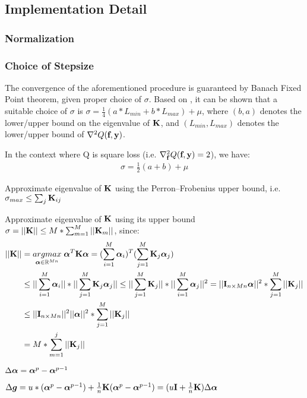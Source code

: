 \documentclass[tablecaption=bottom,wcp]{jmlr} %
\begin{document}
\subsection{Implementation Detail}
\subsubsection{Normalization}



\subsubsection{Choice of Stepsize}

The convergence of the aforementioned procedure is guaranteed by Banach Fixed Point theorem, given proper choice of $\sigma$. Based on \citet{jordan-mkl-2004}, it can be shown that a suitable choice of $\sigma$ is $\sigma = \frac{1}{4}(a*L_{min} + b*L_{max}) + \mu$, where $(b, a)$ denotes the lower/upper bound on the eigenvalue of ${\bf K}$, and $(L_{min}, L_{max})$ denotes the lower/upper bound of $\nabla^2 Q(\textbf{f}, {\bf y})$.

In the context where  Q is square loss (i.e. $\nabla^2_{\textbf{f}} Q(\textbf{f}, {\bf y}) = 2$), we have:
\begin{align*}
\sigma = \frac{1}{2}(a + b) + \mu
\end{align*}

Approximate eigenvalue of ${\bf K}$ using the Perron–Frobenius upper bound, i.e. $\sigma_{max} \leq \sum_j {\bf K}_{ij}$

Approximate eigenvalue of ${\bf K}$ using its upper bound 
$\sigma = ||{\bf K}|| \leq M*\sum_{m=1}^M ||{\bf K}_m||$, since:
\begin{align*}
||{\bf K}|| &= \underset{\boldsymbol{\alpha} \in {\mathbb R}^{Mn}}{argmax} \;
\boldsymbol{\alpha}^T {\bf K} \boldsymbol{\alpha} 
= (\sum_{i=1}^M \boldsymbol{\alpha}_i)^T 
(\sum_{j=1}^M {\bf K}_j \boldsymbol{\alpha}_j) \\
& \leq ||\sum_{i=1}^M \boldsymbol{\alpha}_i|| * ||\sum_{j=1}^M {\bf K}_j \boldsymbol{\alpha}_j|| 
\leq ||\sum_{j=1}^M {\bf K}_j || * ||\sum_{i=1}^M  \boldsymbol{\alpha}_j||^2 
=  ||{\bf I}_{n \times Mn}  \boldsymbol{\alpha}||^2 * \sum_{j=1}^M  ||{\bf K}_j || \\
&\leq  ||{\bf I}_{n \times Mn} ||^2  ||\boldsymbol{\alpha}||^2 *\sum_{j=1}^M  ||{\bf K}_j || \\
& = M * \sum_{m=1}^j ||{\bf K}_j||
\end{align*}


\citet{BB-1988}

$\Delta \boldsymbol{\alpha} = \boldsymbol{\alpha}^p - \boldsymbol{\alpha}^{p-1}$

$\Delta {\mbox{\boldmath$g$}} = u * (\boldsymbol{\alpha}^p - \boldsymbol{\alpha}^{p-1}) + \frac{1}{n} {\bf K}(\boldsymbol{\alpha}^p - \boldsymbol{\alpha}^{p-1}) = 
(u{\bf I} + \frac{1}{n} {\bf K}) \Delta \boldsymbol{\alpha}$
\end{document}

